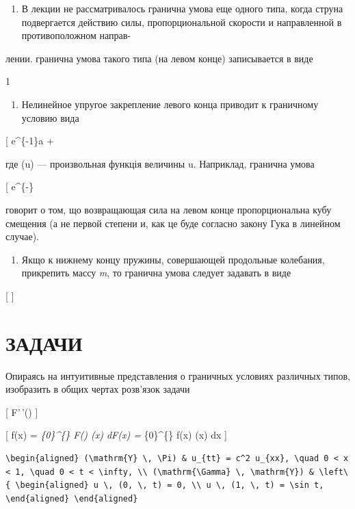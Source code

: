 \documentclass[
  ukrainian,
]{article}
\providecommand{\tightlist}{%
  \setlength{\itemsep}{0pt}\setlength{\parskip}{0pt}}
\begin{document}
\begin{enumerate}
\def\labelenumi{\arabic{enumi}.}
\tightlist
\item
  В лекции не рассматривалось гранична умова еще одного типа, когда
  струна подвергается действию силы, пропорциональной скорости и
  направленной в противоположном направ-
\end{enumerate}

лении. гранична умова такого типа (на левом конце) записывается в виде

1

\begin{enumerate}
\def\labelenumi{\arabic{enumi}.}
\setcounter{enumi}{1}
\tightlist
\item
  Нелинейное упругое закрепление левого конца приводит к граничному
  условию вида
\end{enumerate}

{[} e\^{}\{-1\}a + \omega {]}

где \varphi(u) --- произвольная функція величины u. Наприклад, гранична
умова

{[} e\^{}\{-\alpha\}\sin\omega {]}

говорит о том, що возвращающая сила на левом конце пропорциональна кубу
смещения (а не первой степени и, как це буде согласно закону Гука в
линейном случае).

\begin{enumerate}
\def\labelenumi{\arabic{enumi}.}
\setcounter{enumi}{2}
\tightlist
\item
  Якщо к нижнему концу пружины, совершающей продольные колебания,
  прикрепить массу \emph{m}, то гранична умова следует задавать в виде
\end{enumerate}

{[}  {]}

\section{ЗАДАЧИ}\label{ux437ux430ux434ux430ux447ux438-3}

Опираясь на интуитивные представления о граничных условиях различных
типов, изобразить в общих чертах розв'язок задачи

{[} F'\,'(\omega) {]}

{[} f(x) = \int\emph{\{0\}\^{}\{\infty\} F(\omega) \cos(\omega x)
d\omega \qquad \qquad F(x) =  \int}\{0\}\^{}\{\infty\} f(x)
\cos(\omega x) dx {]}

\begin{verbatim}
\begin{aligned} (\mathrm{Y} \, \Pi) & u_{tt} = c^2 u_{xx}, \quad 0 < x < 1, \quad 0 < t < \infty, \\ (\mathrm{\Gamma} \, \mathrm{Y}) & \left\{ \begin{aligned} u \, (0, \, t) = 0, \\ u \, (1, \, t) = \sin t, \end{aligned} \end{aligned}
\end{verbatim}
\end{document}
